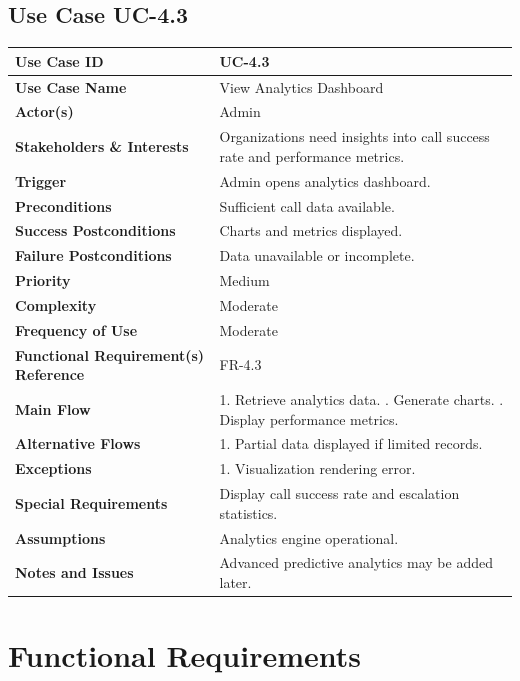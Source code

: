 \documentclass[12pt,a4paper]{report}
\begin{document}
\subsection*{Use Case UC-4.3}
\begin{longtable}{|p{4cm}|p{9cm}|}
\hline
\textbf{Use Case ID} & UC-4.3 \\ \hline
\textbf{Use Case Name} & View Analytics Dashboard \\ \hline
\textbf{Actor(s)} & Admin \\ \hline
\textbf{Stakeholders \& Interests} & Organizations need insights into call success rate and performance metrics. \\ \hline
\textbf{Trigger} & Admin opens analytics dashboard. \\ \hline
\textbf{Preconditions} & Sufficient call data available. \\ \hline
\textbf{Success Postconditions} & Charts and metrics displayed. \\ \hline
\textbf{Failure Postconditions} & Data unavailable or incomplete. \\ \hline
\textbf{Priority} & Medium \\ \hline
\textbf{Complexity} & Moderate \\ \hline
\textbf{Frequency of Use} & Moderate \\ \hline
\textbf{Functional Requirement(s) Reference} & FR-4.3 \\ \hline
\textbf{Main Flow} &
1. Retrieve analytics data. \newline
2. Generate charts. \newline
3. Display performance metrics. \\ \hline
\textbf{Alternative Flows} &
1. Partial data displayed if limited records. \\ \hline
\textbf{Exceptions} &
1. Visualization rendering error. \\ \hline
\textbf{Special Requirements} &
Display call success rate and escalation statistics. \\ \hline
\textbf{Assumptions} &
Analytics engine operational. \\ \hline
\textbf{Notes and Issues} &
Advanced predictive analytics may be added later. \\ \hline
\end{longtable}
\section{Functional Requirements}
\end{document}
